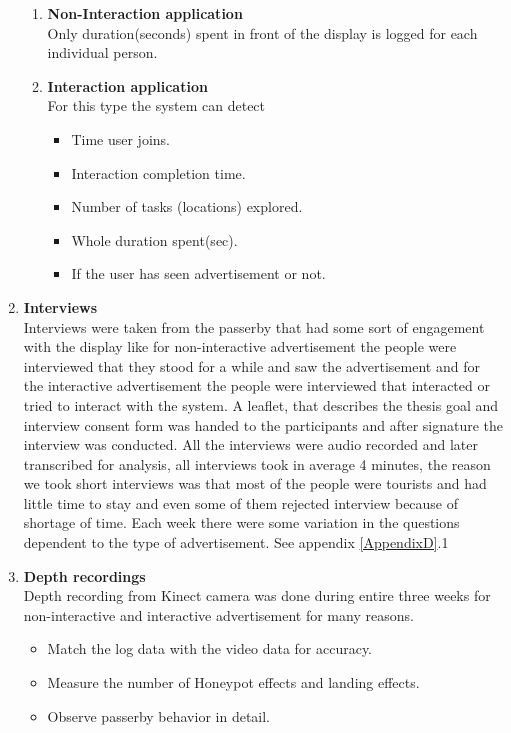 \begin{enumerate}
\begin{enumerate}
\item	\textbf{Non-Interaction application} \\
Only duration(seconds) spent in front of the display is logged for each individual person.

\item	\textbf{Interaction application}\\
For this type the system can detect

\begin{itemize}
\item	Time user joins.
\item	Interaction completion time.
\item	Number of tasks (locations) explored.
\item	Whole duration spent(sec).
\item	If the user has seen advertisement or not.
\end{itemize}

\end{enumerate}

\item \textbf{Interviews} \\
Interviews were taken from the passerby that had some sort of engagement with the display like for non-interactive advertisement the people were interviewed that they stood for a while and saw the advertisement and for the interactive advertisement the people were interviewed that interacted or tried to interact with the system.
A leaflet, that describes the thesis goal and interview consent form was handed to the participants and after signature the interview was conducted. All the interviews were audio recorded and later transcribed for analysis, all interviews took in average 4 minutes, the reason we took short interviews was that most of the people were tourists and had little time to stay and even some of them rejected interview because of shortage of time.
Each week there were some variation in the questions dependent to the type of advertisement.  See appendix \ref{AppendixD}.1


\item \textbf{Depth recordings} \\
Depth recording from Kinect camera was done during entire three weeks for non-interactive and interactive advertisement for many reasons.

\begin{itemize}
\item Match the log data with the video data for accuracy.
\item Measure the number of Honeypot effects and landing effects.
\item Observe passerby behavior in detail.
\end{itemize}


\end{enumerate}
